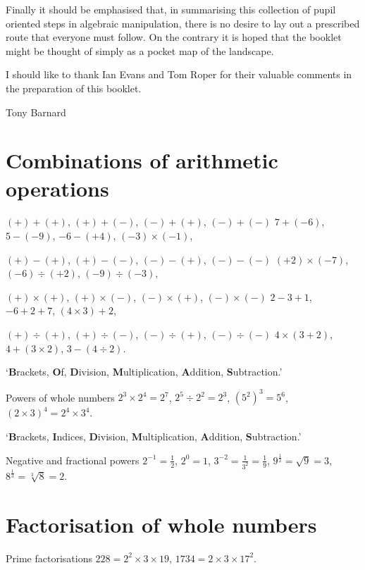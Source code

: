 \documentclass{article}
\begin{document}
Finally it should be emphasised that, in summarising this collection of pupil oriented steps in algebraic manipulation, there is no desire to lay out a prescribed route that everyone must follow.  On the contrary it is hoped that the booklet might be thought of simply as a pocket map of the landscape.

I should like to thank Ian Evans and Tom Roper for their valuable comments in the preparation of this booklet.

Tony Barnard

\newpage


\section{Combinations of arithmetic operations}

\((+)+(+)\), \((+)+(-)\), \((-)+(+)\), \((-)+(-)\) \hfill \(7+(-6)\), \(5-(-9)\), \(-6-(+4)\), \((-3) \times (-1)\),

\((+)-(+)\), \((+)-(-)\), \((-)-(+)\), \((-)-(-)\) \hfill \((+2) \times (-7)\), \((-6) \div (+2)\), \((-9) \div (-3)\),

\((+)\times(+)\), \((+)\times(-)\), \((-)\times(+)\), \((-)\times(-)\) \hfill \(2-3+1\), \(-6+2+7\), \((4\times 3)+2\),

\((+)\div(+)\), \((+)\div(-)\), \((-)\div(+)\), \((-)\div(-)\) \hfill \(4 \times(3+2)\), \(4+(3\times 2)\), \(3-(4\div 2)\).

\lq\textbf{B}rackets, \textbf{O}f, \textbf{D}ivision, \textbf{M}ultiplication, \textbf{A}ddition, \textbf{S}ubtraction.'

Powers of whole numbers \hfill \(2^3 \times 2^4 = 2^7\), \(2^5 \div 2^2 = 2^3\), \((5^2)^3 = 5^6\), \((2 \times 3)^4 = 2^4 \times 3^4\).

\lq\textbf{B}rackets, \textbf{I}ndices, \textbf{D}ivision, \textbf{M}ultiplication, \textbf{A}ddition, \textbf{S}ubtraction.'

Negative and fractional powers \hfill \(2^{-1}=\frac{1}{2}\), \(2^0 = 1\), \(3^{-2} = \frac{1}{3^2} = \frac{1}{9}\), \(9^\frac{1}{2} = \sqrt{9} = 3\), \(8^\frac{1}{3} = \sqrt[3]{8} =2\).

\section{Factorisation of whole numbers}

Prime factorisations \hfill \(228 = 2^2 \times 3 \times 19\), \(1734 = 2 \times 3 \times 17^2\).
\end{document}
